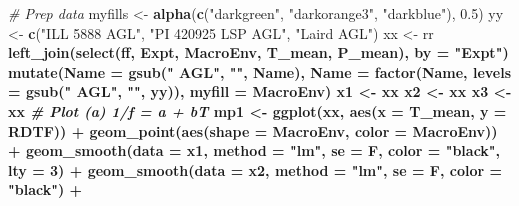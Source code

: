 \documentclass[
]{article}
\newenvironment{Shaded}{\begin{snugshade}}{\end{snugshade}}
\newcommand{\CommentTok}[1]{\textcolor[rgb]{0.56,0.35,0.01}{\textit{#1}}}
\newcommand{\DataTypeTok}[1]{\textcolor[rgb]{0.13,0.29,0.53}{#1}}
\newcommand{\DecValTok}[1]{\textcolor[rgb]{0.00,0.00,0.81}{#1}}
\newcommand{\FloatTok}[1]{\textcolor[rgb]{0.00,0.00,0.81}{#1}}
\newcommand{\KeywordTok}[1]{\textcolor[rgb]{0.13,0.29,0.53}{\textbf{#1}}}
\newcommand{\NormalTok}[1]{#1}
\newcommand{\OperatorTok}[1]{\textcolor[rgb]{0.81,0.36,0.00}{\textbf{#1}}}
\newcommand{\StringTok}[1]{\textcolor[rgb]{0.31,0.60,0.02}{#1}}
\begin{document}
\begin{Shaded}
\begin{Highlighting}[]
\CommentTok{# Prep data}
\NormalTok{myfills <-}\StringTok{ }\KeywordTok{alpha}\NormalTok{(}\KeywordTok{c}\NormalTok{(}\StringTok{"darkgreen"}\NormalTok{, }\StringTok{"darkorange3"}\NormalTok{, }\StringTok{"darkblue"}\NormalTok{), }\FloatTok{0.5}\NormalTok{)}
\NormalTok{yy <-}\StringTok{ }\KeywordTok{c}\NormalTok{(}\StringTok{"ILL 5888 AGL"}\NormalTok{, }\StringTok{"PI 420925 LSP AGL"}\NormalTok{,  }\StringTok{"Laird AGL"}\NormalTok{)}
\NormalTok{xx <-}\StringTok{ }\NormalTok{rr }\OperatorTok{%
\StringTok{  }\KeywordTok{left_join}\NormalTok{(}\KeywordTok{select}\NormalTok{(ff, Expt, MacroEnv, T_mean, P_mean), }\DataTypeTok{by =} \StringTok{"Expt"}\NormalTok{) }\OperatorTok{%
\StringTok{  }\KeywordTok{mutate}\NormalTok{(}\DataTypeTok{Name =} \KeywordTok{gsub}\NormalTok{(}\StringTok{" AGL"}\NormalTok{, }\StringTok{""}\NormalTok{, Name),}
         \DataTypeTok{Name =} \KeywordTok{factor}\NormalTok{(Name, }\DataTypeTok{levels =} \KeywordTok{gsub}\NormalTok{(}\StringTok{" AGL"}\NormalTok{, }\StringTok{""}\NormalTok{, yy)),}
         \DataTypeTok{myfill =}\NormalTok{ MacroEnv)}
\NormalTok{x1 <-}\StringTok{ }\NormalTok{xx }\OperatorTok{%
\NormalTok{x2 <-}\StringTok{ }\NormalTok{xx }\OperatorTok{%
\NormalTok{x3 <-}\StringTok{ }\NormalTok{xx }\OperatorTok{%
\CommentTok{# Plot (a) 1/f = a + bT}
\NormalTok{mp1 <-}\StringTok{ }\KeywordTok{ggplot}\NormalTok{(xx, }\KeywordTok{aes}\NormalTok{(}\DataTypeTok{x =}\NormalTok{ T_mean, }\DataTypeTok{y =}\NormalTok{ RDTF)) }\OperatorTok{+}
\StringTok{  }\KeywordTok{geom_point}\NormalTok{(}\KeywordTok{aes}\NormalTok{(}\DataTypeTok{shape =}\NormalTok{ MacroEnv, }\DataTypeTok{color =}\NormalTok{ MacroEnv)) }\OperatorTok{+}
\StringTok{  }\KeywordTok{geom_smooth}\NormalTok{(}\DataTypeTok{data =}\NormalTok{ x1, }\DataTypeTok{method =} \StringTok{"lm"}\NormalTok{, }\DataTypeTok{se =}\NormalTok{ F, }\DataTypeTok{color =} \StringTok{"black"}\NormalTok{, }\DataTypeTok{lty =} \DecValTok{3}\NormalTok{) }\OperatorTok{+}
\StringTok{  }\KeywordTok{geom_smooth}\NormalTok{(}\DataTypeTok{data =}\NormalTok{ x2, }\DataTypeTok{method =} \StringTok{"lm"}\NormalTok{, }\DataTypeTok{se =}\NormalTok{ F, }\DataTypeTok{color =} \StringTok{"black"}\NormalTok{) }\OperatorTok{+}
}}}}}
\end{Highlighting}
\end{Shaded}
\end{document}
